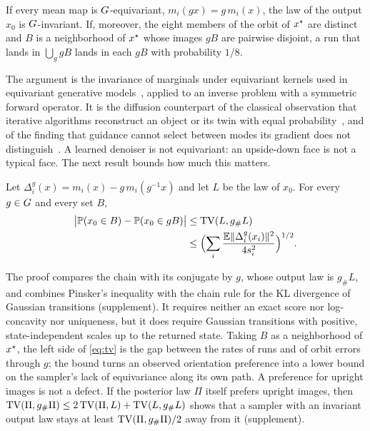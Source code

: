 \begin{theorem}
\label{thm:equivariant}
If every mean map is $G$-equivariant, $m_i(gx)=g\,m_i(x)$, the law of the output $x_0$ is $G$-invariant.
If, moreover, the eight members of the orbit of $x^\star$ are distinct and $B$ is a neighborhood of $x^\star$ whose images $gB$ are pairwise disjoint, a run that lands in $\bigcup_g gB$ lands in each $gB$ with probability $1/8$.
\end{theorem}

The argument is the invariance of marginals under equivariant kernels used in equivariant generative models~\cite{xu2022geodiff,hoogeboom2022edm}, applied to an inverse problem with a symmetric forward operator.
It is the diffusion counterpart of the classical observation that iterative algorithms reconstruct an object or its twin with equal probability~\cite{fienup1986stagnation}, and of the finding that guidance cannot select between modes its gradient does not distinguish~\cite{dandapanthula2026tilting}.
A learned denoiser is not equivariant: an upside-down face is not a typical face.
The next result bounds how much this matters.

\begin{theorem}
\label{thm:tv}
Let $\Delta^g_i(x)=m_i(x)-g\,m_i(g^{-1}x)$ and let $L$ be the law of $x_0$.
For every $g\in G$ and every set $B$,
\begin{align}
\bigl|\mathbb{P}(x_0\in B)-\mathbb{P}(x_0\in gB)\bigr| &\le \mathrm{TV}(L,g_\#L)\notag\\
&\le\Bigl(\sum_i\frac{\mathbb{E}\|\Delta^g_i(x_i)\|^2}{4s_i^2}\Bigr)^{1/2}.
\label{eq:tv}
\end{align}
\end{theorem}

The proof compares the chain with its conjugate by $g$, whose output law is $g_\#L$, and combines Pinsker's inequality with the chain rule for the KL divergence of Gaussian transitions (supplement).
It requires neither an exact score nor log-concavity nor uniqueness, but it does require Gaussian transitions with positive, state-independent scales up to the returned state.
Taking $B$ as a neighborhood of $x^\star$, the left side of \cref{eq:tv} is the gap between the rates of \good runs and of orbit errors through $g$; the bound turns an observed orientation preference into a lower bound on the sampler's lack of equivariance along its own path.
A preference for upright images is not a defect.
If the posterior law $\Pi$ itself prefers upright images, then $\mathrm{TV}(\Pi,g_\#\Pi)\le2\,\mathrm{TV}(\Pi,L)+\mathrm{TV}(L,g_\#L)$ shows that a sampler with an invariant output law stays at least $\mathrm{TV}(\Pi,g_\#\Pi)/2$ away from it (supplement).

